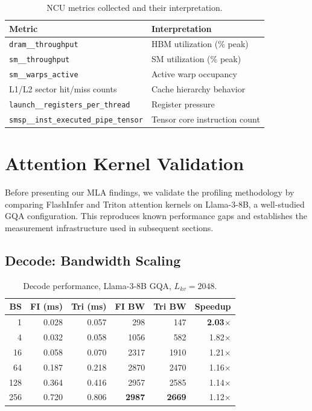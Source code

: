 \documentclass[10pt,twocolumn]{article}
\begin{document}
\begin{table}[h]
\centering
\small
\caption{NCU metrics collected and their interpretation.}
\label{tab:ncu_metrics}
\begin{tabular}{@{}ll@{}}
\toprule
Metric & Interpretation \\
\midrule
\texttt{dram\_\_throughput}             & HBM utilization (\% peak) \\
\texttt{sm\_\_throughput}               & SM utilization (\% peak) \\
\texttt{sm\_\_warps\_active}            & Active warp occupancy \\
L1/L2 sector hit/miss counts           & Cache hierarchy behavior \\
\texttt{launch\_\_registers\_per\_thread} & Register pressure \\
\texttt{smsp\_\_inst\_executed\_pipe\_tensor} & Tensor core instruction count \\
\bottomrule
\end{tabular}
\end{table}

\section{Attention Kernel Validation}
\label{sec:validation}

Before presenting our MLA findings, we validate the profiling methodology by comparing FlashInfer and Triton attention kernels on Llama-3-8B, a well-studied GQA configuration.  This reproduces known performance gaps and establishes the measurement infrastructure used in subsequent sections.

\subsection{Decode: Bandwidth Scaling}
\label{sec:decode}

\begin{table}[h]
\centering
\small
\caption{Decode performance, Llama-3-8B GQA, $L_{kv}=2048$.}
\label{tab:decode_bs}
\begin{tabular}{@{}rrrrrr@{}}
\toprule
BS & FI (ms) & Tri (ms) & FI BW & Tri BW & Speedup \\
\midrule
  1 & 0.028 & 0.057 &  298 &  147 & \textbf{2.03$\times$} \\
  4 & 0.032 & 0.058 & 1056 &  582 & 1.82$\times$ \\
 16 & 0.058 & 0.070 & 2317 & 1910 & 1.21$\times$ \\
 64 & 0.187 & 0.218 & 2870 & 2470 & 1.16$\times$ \\
128 & 0.364 & 0.416 & 2957 & 2585 & 1.14$\times$ \\
256 & 0.720 & 0.806 & \textbf{2987} & \textbf{2669} & 1.12$\times$ \\
\bottomrule
\end{tabular}
\end{table}
\end{document}

